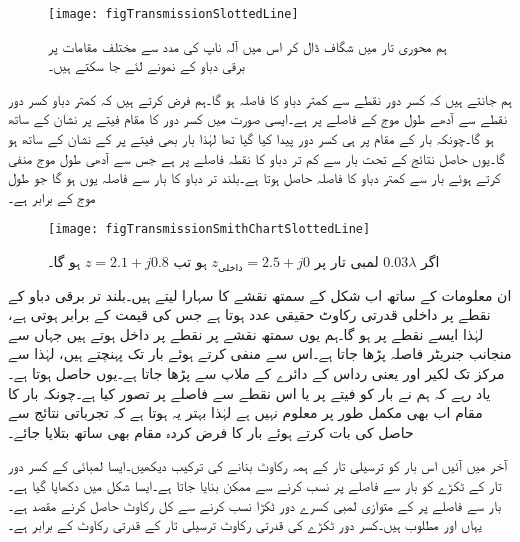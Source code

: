 \begin{figure}
\centering
\texttt{[image: figTransmissionSlottedLine]}
\caption{ہم محوری تار میں شگاف ڈال کر اس میں آلہ ناپ کی مدد سے مختلف مقامات پر برقی دباو  کے نمونے لئے جا سکتے ہیں۔}
\label{شکل_ترسیلی_ہم_محوری_شگاف_دار}
\end{figure}
ہم جانتے ہیں کہ کسر دور نقطے سے کمتر دباو کا فاصلہ  ہو گا۔ہم فرض کرتے ہیں کہ کمتر دباو کسر دور نقطے سے آدھے طول موج کے فاصلے پر ہے۔ایسی صورت میں کسر دور کا مقام فیتے پر  نشان کے ساتھ ہو گا۔چونکہ بار کے مقام پر ہی کسر دور پیدا کیا گیا تھا لہٰذا بار بھی فیتے پر  کے نشان کے ساتھ ہو گا۔یوں حاصل نتائج کے تحت بار سے کم تر دباو کا نقطہ  فاصلے پر ہے جس سے آدھی طول موج منفی کرتے ہوئے بار سے کمتر دباو کا فاصلہ  حاصل ہوتا ہے۔بلند تر دباو کا بار سے فاصلہ یوں
  ہو گا جو  طول موج کے برابر ہے۔
\begin{figure}
\centering
\texttt{[image: figTransmissionSmithChartSlottedLine]}
\caption{اگر $0.03\lambda$ لمبی تار پر $z_{\text{داخلی}}=2.5+j0$ ہو تب $z=2.1+j0.8$ ہو گا۔}
\label{شکل_ترسیلی_ہم_محوری_تجرباتی_نتائج}
\end{figure}

ان معلومات کے ساتھ اب شکل  کے سمتھ نقشے کا سہارا لیتے ہیں۔بلند تر برقی دباو کے نقطے پر  داخلی قدرتی رکاوٹ حقیقی عدد ہوتا ہے جس کی قیمت  کے برابر ہوتی ہے، لہٰذا ایسے نقطے پر  ہو گا۔ہم یوں سمتھ نقشے پر  نقطے پر داخل ہوتے ہیں جہاں سے منجانب جنریٹر فاصلہ  پڑھا جاتا ہے۔اس سے  منفی کرتے ہوئے  بار تک پہنچتے ہیں، لہٰذا  سے مرکز تک لکیر اور  یعنی      رداس کے دائرے کے ملاپ سے  پڑھا جاتا ہے۔یوں  حاصل ہوتا ہے۔یاد رہے کہ ہم نے بار کو فیتے پر  یا اس نقطے سے  فاصلے پر تصور کیا ہے۔چونکہ بار کا مقام اب بھی مکمل طور پر معلوم نہیں ہے لہٰذا بہتر یہ ہوتا ہے کہ تجرباتی نتائج سے حاصل  کی بات کرتے ہوئے بار کا فرض کردہ مقام بھی ساتھ بتلایا جائے۔

آخر میں آئیں اس بار کو  ترسیلی تار کے ہمہ رکاوٹ بنانے کی ترکیب دیکھیں۔ایسا  لمبائی کے کسر دور تار کے ٹکڑے کو بار سے  فاصلے پر نسب کرنے سے ممکن بنایا جاتا ہے۔ایسا شکل  میں دکھایا گیا ہے۔بار سے  فاصلے پر  کے متوازی  لمبی کسرے دور ٹکڑا نسب کرنے سے کل رکاوٹ  حاصل کرنے مقصد ہے۔یہاں  اور  مطلوب ہیں۔کسر دور ٹکڑے کی قدرتی رکاوٹ ترسیلی تار کے قدرتی رکاوٹ  کے برابر ہے۔ 

